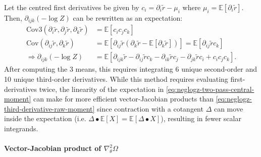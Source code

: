 \documentclass{article}
\begin{document}
Let the centred first derivatives be given by $c_{i} = \partial_{i} \tilde{r} - \mu_{i}$ where $\mu_{i} = \mathbb{E}[\partial_{i} \tilde{r}]$.
Then, $\partial_{ijk}(-\log Z)$ can be rewritten as an expectation:
%
\begin{align}
  \mathrm{Cov3}(\partial_{i} \tilde{r}, \partial_{j} \tilde{r}, \partial_{k} \tilde{r}) & = \mathbb{E}[c_{i} c_{j} c_{k}]                                                                                                                                                                           \\
  \mathrm{Cov}(\partial_{ij} \tilde{r}, \partial_{k} \tilde{r})                         & = \mathbb{E}[\partial_{ij} \tilde{r} (\partial_{k} \tilde{r} - \mathbb{E}[\partial_{k} \tilde{r}])] = \mathbb{E}[\partial_{ij} \tilde{r} c_{k}]                                                           \\
  \Rightarrow \partial_{ijk} (-\log Z)                                                  & = \mathbb{E} [ \partial_{ijk} \tilde{r} - \partial_{ij} \tilde{r} c_{k} - \partial_{ik} \tilde{r} c_{j} - \partial_{jk} \tilde{r} c_{i} + c_{i} c_{j} c_{k} ]. \label{eq:neglogz-two-pass-central-moment}
\end{align}
%
After computing the 3 means, this requires integrating 6 unique second-order and 10 unique third-order derivatives.
While this method requires evaluating first-derivatives twice, the linearity of the expectation in \cref{eq:neglogz-two-pass-central-moment} can make for more efficient vector-Jacobian products than \cref{eq:neglogz-third-derivative-raw-moment} since contraction with a cotangent $\Delta$ can move inside the expectation (i.e. $\Delta \bullet \mathbb{E}[X] = \mathbb{E}[\Delta \bullet X]$), resulting in fewer scalar integrands.

\paragraph{Vector-Jacobian product of $\nabla_\theta^2 \Omega$}
\end{document}
